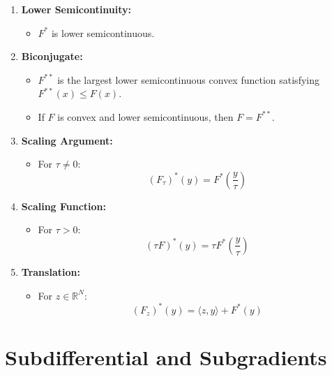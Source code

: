 \documentclass{article}
\begin{document}
\begin{enumerate}
    \item \textbf{Lower Semicontinuity:}
    \begin{itemize}
        \item \( F^* \) is lower semicontinuous.
    \end{itemize}
    
    \item \textbf{Biconjugate:}
    \begin{itemize}
        \item \( F^{**} \) is the largest lower semicontinuous convex function satisfying \( F^{**}(x) \leq F(x) \).
        \item If \( F \) is convex and lower semicontinuous, then \( F = F^{**} \).
    \end{itemize}
    
    \item \textbf{Scaling Argument:}
    \begin{itemize}
        \item For \( \tau \neq 0 \):
        \[
        (F_\tau)^*(y) = F^*\left(\frac{y}{\tau}\right)
        \]
    \end{itemize}
    
    \item \textbf{Scaling Function:}
    \begin{itemize}
        \item For \( \tau > 0 \):
        \[
        (\tau F)^*(y) = \tau F^*\left(\frac{y}{\tau}\right)
        \]
    \end{itemize}
    
    \item \textbf{Translation:}
    \begin{itemize}
        \item For \( z \in \mathbb{R}^N \):
        \[
        (F_z)^*(y) = \langle z, y \rangle + F^*(y)
        \]
    \end{itemize}
\end{enumerate}

\section*{Subdifferential and Subgradients}
\end{document}
